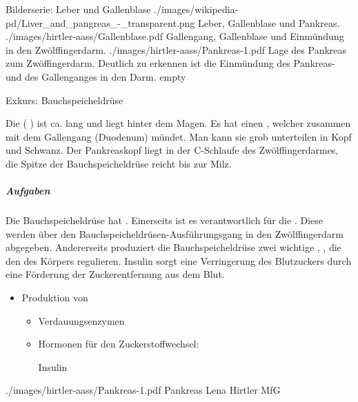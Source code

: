  


\begin{PictureSeriesWide}{}{Bilderserie: Leber und
Gallenblase}
{./images/wikipedia-pd/Liver_and_pangreas_-_transparent.png}
{Leber, Gallenblase und
Pankreas.
}
{./images/hirtler-aass/Gallenblase.pdf}
{Gallengang, Gallenblase und Einmündung in den
Zwölffingerdarm.
}
{./images/hirtler-aass/Pankreas-1.pdf}
{Lage des Pankreas zum Zwöffingerdarm. Deutlich zu erkennen
ist die Einmündung des Pankreas- und des Gallenganges in
den Darm. }
{empty}
{}
\end{PictureSeriesWide}



\clearpage%

\TextSlideTeaser
{Exkurs: Bauchspeicheldrüse}%
{%
Die  
( ) 
ist ca. \CM* lang und liegt
hinter dem Magen. Es hat einen , welcher
zusammen mit dem Gallengang 
(Duodenum) mündet. Man kann sie grob unterteilen in Kopf und
Schwanz. Der Pankreaskopf liegt in der C-Schlaufe des
Zwölffingerdarmes, die Spitze der Bauchspeicheldrüse reicht bis zur
Milz.

\subparagraph{Aufgaben} 
Die Bauchspeicheldrüse hat .
Einerseits ist es verantwortlich für die . Diese werden über den
Bauchspeicheldrüsen-Ausführungsgang in den Zwölffingerdarm abgegeben.
Andererseits produziert die Bauchspeicheldrüse zwei wichtige ,
 , die  den
 des Körpers regulieren. Insulin sorgt eine
Verringerung des Blutzuckers durch eine Förderung der
Zuckerentfernung aus dem Blut. 
}%
{
\begin{itemize}
  \item Produktion von
  \begin{itemize}
    \item Verdauungsenzymen
    \item Hormonen für den Zucker\-stoff\-wechsel:
    
    Insulin 
  \end{itemize}
\end{itemize}}%
{./images/hirtler-aass/Pankreas-1.pdf}%
{Pankreas}%
{}%
{Lena Hirtler}%
{MfG}%




